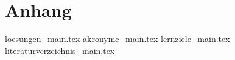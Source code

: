 
\part{Anhang}

{
{loesungen_main.tex}
}
{}
{akronyme_main.tex}
{lernziele_main.tex}
{literaturverzeichnis_main.tex}